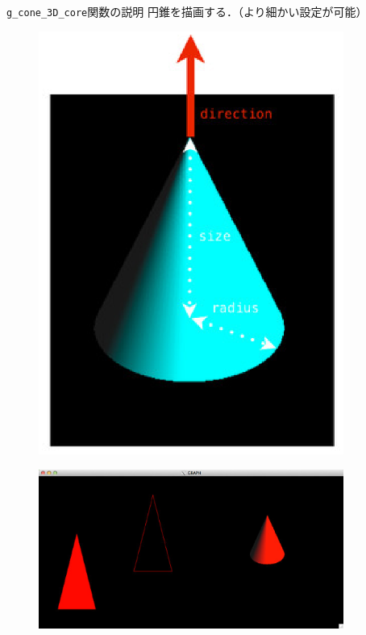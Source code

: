 \documentclass[platex,a4paper,12pt]{jsarticle}%
\begin{document}
\begin{itembox}[l]{\texttt{g\_cone\_3D\_core}関数の説明}
円錐を描画する．（より細かい設定が可能）
\end{itembox}
\begin{figure}[htb]
\centering
	\includegraphics[width=100mm]{Canvas_g_cone.eps}
\end{figure}

\begin{figure}[htb]
\centering
	\includegraphics[width=100mm]{Canvas_g_cone2.eps}
\end{figure}
\end{document}
